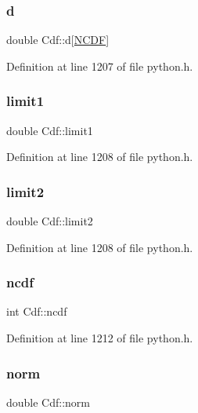 \subsubsection{\texorpdfstring{d}{d}}
{\footnotesize\ttfamily double Cdf\+::d\mbox{[}\hyperlink{python_8h_a8fcad90a1005b8d2b876efbafa401305}{N\+C\+DF}\mbox{]}}



Definition at line 1207 of file python.\+h.

\mbox{\label{struct_cdf_a3617b232fd381fb21e716c7885b3478a}} 
\subsubsection{\texorpdfstring{limit1}{limit1}}
{\footnotesize\ttfamily double Cdf\+::limit1}



Definition at line 1208 of file python.\+h.

\mbox{\label{struct_cdf_abfa2f57780de00749a6a2fc6b2a55aac}} 
\subsubsection{\texorpdfstring{limit2}{limit2}}
{\footnotesize\ttfamily double Cdf\+::limit2}



Definition at line 1208 of file python.\+h.

\mbox{\label{struct_cdf_abc8ea82846fbd30f238131312b3824d0}} 
\subsubsection{\texorpdfstring{ncdf}{ncdf}}
{\footnotesize\ttfamily int Cdf\+::ncdf}



Definition at line 1212 of file python.\+h.

\mbox{\label{struct_cdf_a336a610024fec24a921042fb7464dfe9}} 
\subsubsection{\texorpdfstring{norm}{norm}}
{\footnotesize\ttfamily double Cdf\+::norm}



